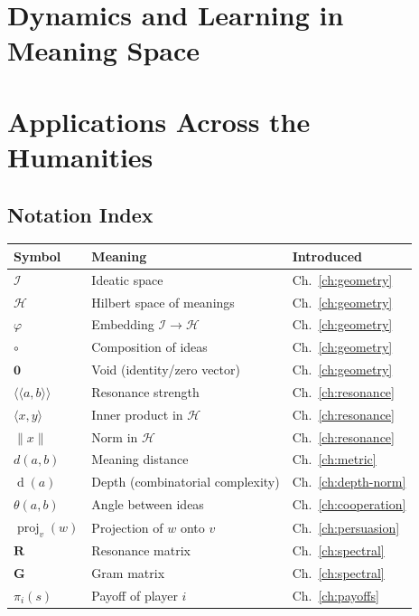 \documentclass[11pt,openany]{book}
\theoremstyle{definition}
\theoremstyle{plain}
\theoremstyle{remark}
\newcommand{\IS}{\mathcal{I}}               %
\newcommand{\compose}{\circ}                 %
\newcommand{\void}{\mathbf{0}}              %
\newcommand{\depth}{\operatorname{d}}       %
\newcommand{\Hspace}{\mathcal{H}}            %
\newcommand{\rs}[2]{\langle\!\langle #1, #2 \rangle\!\rangle}  %
\newcommand{\ip}[2]{\langle #1, #2 \rangle}  %
\newcommand{\nrm}[1]{\lVert #1 \rVert}       %
\newcommand{\proj}[2]{\operatorname{proj}_{#1}\!\left(#2\right)} %
\newcommand{\cosangle}[2]{\theta(#1,#2)}     %
\newcommand{\Gram}{\mathbf{G}}               %
\newcommand{\RMat}{\mathbf{R}}               %
\newcommand{\payoff}[2]{\pi_{#1}(#2)}        %
\begin{document}
\part{Dynamics and Learning in Meaning Space}
\label{part:dynamics}







\part{Applications Across the Humanities}
\label{part:applications}







\backmatter

\chapter*{Notation Index}

\begin{tabular}{lll}
\textbf{Symbol} & \textbf{Meaning} & \textbf{Introduced} \\
\hline
$\IS$ & Ideatic space & Ch.~\ref{ch:geometry} \\
$\Hspace$ & Hilbert space of meanings & Ch.~\ref{ch:geometry} \\
$\varphi$ & Embedding $\IS \to \Hspace$ & Ch.~\ref{ch:geometry} \\
$\compose$ & Composition of ideas & Ch.~\ref{ch:geometry} \\
$\void$ & Void (identity/zero vector) & Ch.~\ref{ch:geometry} \\
$\rs{a}{b}$ & Resonance strength & Ch.~\ref{ch:resonance} \\
$\ip{x}{y}$ & Inner product in $\Hspace$ & Ch.~\ref{ch:resonance} \\
$\nrm{x}$ & Norm in $\Hspace$ & Ch.~\ref{ch:resonance} \\
$d(a,b)$ & Meaning distance & Ch.~\ref{ch:metric} \\
$\depth(a)$ & Depth (combinatorial complexity) & Ch.~\ref{ch:depth-norm} \\
$\cosangle{a}{b}$ & Angle between ideas & Ch.~\ref{ch:cooperation} \\
$\proj{v}{w}$ & Projection of $w$ onto $v$ & Ch.~\ref{ch:persuasion} \\
$\RMat$ & Resonance matrix & Ch.~\ref{ch:spectral} \\
$\Gram$ & Gram matrix & Ch.~\ref{ch:spectral} \\
$\payoff{i}{s}$ & Payoff of player $i$ & Ch.~\ref{ch:payoffs} \\
\end{tabular}
\end{document}

